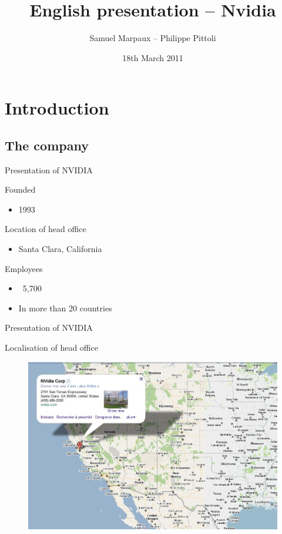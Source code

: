 \documentclass{beamer}
\date{18th March 2011}
\author{Samuel Marpaux -- Philippe Pittoli}
\title[Nvidia]{English presentation -- Nvidia}
\begin{document}

\section{Introduction}
\subsection{The company}
\begin{frame}{Presentation of NVIDIA}
	\transdissolve[duration=0.03]

	\begin{block}{Founded}
		\begin{itemize}
			\item<+->{1993}
		\end{itemize}
	\end{block}	
	\pause
	\begin{block}{Location of head office}
		\begin{itemize}
			\item<+->{Santa Clara, California}
		\end{itemize}
	\end{block}
	\pause
	\begin{block}{Employees}
		\begin{itemize}
			\item<+->{~5,700}
			\item<+->{In more than 20 countries}
		\end{itemize}
	\end{block}
\end{frame}

\begin{frame}{Presentation of NVIDIA}
	\transdissolve[duration=0.08]
	\begin{block}{Localisation of head office}
	\begin{figure}[h]
		\includegraphics[width=1.05\textheight]{nvidiamap.jpg}
	\end{figure}
	\end{block}
\end{frame}
\end{document}
